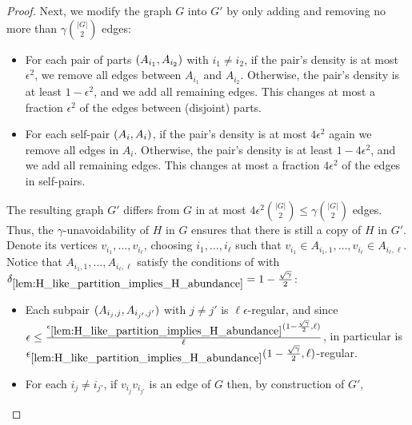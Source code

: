 \begin{theorem}
\begin{proof}
                Next, we modify the graph $G$ into $G'$ by only adding and removing no more than $\gamma {|G| \choose 2}$
                edges:
                \begin{itemize}
                    \item For each pair of parts $( A_{i_1}, A_{i_2} )$ with $i_1 \neq i_2$, if the pair's density is
                        at most $\epsilon^2$, we remove all edges between $A_{i_1}$ and $A_{i_2}$.
                        Otherwise, the pair's density is at least $1 - \epsilon^2$, and we add all remaining edges.
                        This changes at most a fraction $\epsilon^2$ of the edges between (disjoint) parts.
                    \item For each self-pair $( A_i, A_i )$, if the pair's density is at most $4 \epsilon^2$ again we
                        remove all edges in $A_i$.
                        Otherwise, the pair's density is at least $1 - 4 \epsilon^2$, and we add all remaining edges.
                        This changes at most a fraction $4 \epsilon^2$ of the edges in self-pairs.
                \end{itemize}
                The resulting graph $G'$ differs from $G$ in at most $4 \epsilon^2 {|G| \choose 2} \leq \gamma {|G| \choose 2}$
                edges.
                Thus, the $\gamma$-unavoidability of $H$ in $G$ ensures that there is still a copy of $H$ in $G'$.
                Denote its vertices $v_{i_1}, \dots, v_{i_\ell}$, choosing $i_1, \dots, i_\ell$ such that
                $v_{i_1} \in A_{i_1,1}, \dots, v_{i_\ell} \in A_{i_\ell, \ell}$.
                Notice that $A_{i_1,1}, \dots, A_{i_\ell, \ell}$ satisfy the conditions of 
                with $\delta_{\ref{lem:H_like_partition_implies_H_abundance}} = 1 - \frac{\sqrt{\gamma}}{2}$:
                \begin{itemize}
                    \item Each subpair $( A_{i_j, j}, A_{i_{j'}, j'} )$ with $j \neq j'$ is $\ell \epsilon$-regular,
                        and since $\epsilon \leq \frac{\epsilon_{\ref{lem:H_like_partition_implies_H_abundance}} ( 1 - \frac{\sqrt{\gamma}}{2}, \ell )}{\ell}$,
                        in particular is $\epsilon_{\ref{lem:H_like_partition_implies_H_abundance}} ( 1 - \frac{\sqrt{\gamma}}{2}, \ell )$-regular.
                    \item For each $i_j \neq i_{j'}$, if $v_{i_j} v_{i_{j'}}$ is an edge of $G$ then, by construction of $G'$,

\end{itemize}
\end{proof}
\end{theorem}
